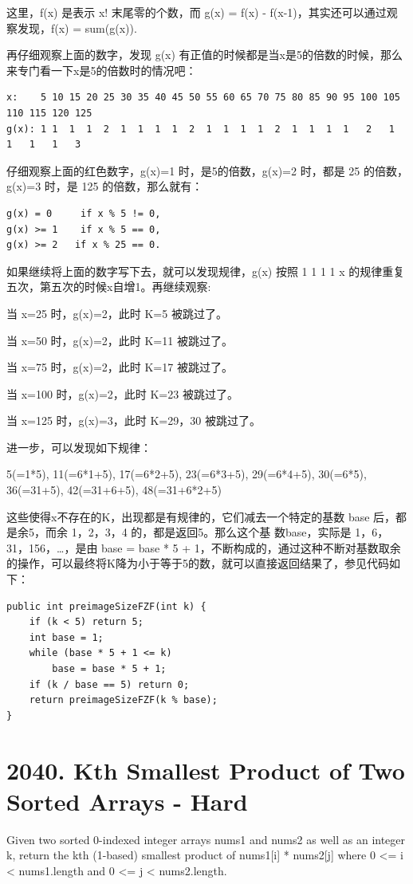 \documentclass[9pt, b5paaper]{book}
\begin{document}
这里，f(x) 是表示 x! 末尾零的个数，而 g(x) = f(x) - f(x-1)，其实还可以通过观察发现，f(x) = sum(g(x)).

再仔细观察上面的数字，发现 g(x) 有正值的时候都是当x是5的倍数的时候，那么来专门看一下x是5的倍数时的情况吧：

\begin{verbatim}
x:    5 10 15 20 25 30 35 40 45 50 55 60 65 70 75 80 85 90 95 100 105 110 115 120 125
g(x): 1 1  1  1  2  1  1  1  1  2  1  1  1  1  2  1  1  1  1   2   1   1   1   1   3
\end{verbatim}

仔细观察上面的红色数字，g(x)=1 时，是5的倍数，g(x)=2 时，都是 25 的倍数，g(x)=3 时，是 125 的倍数，那么就有：
\begin{verbatim}
g(x) = 0     if x % 5 != 0,
g(x) >= 1    if x % 5 == 0,
g(x) >= 2   if x % 25 == 0.
\end{verbatim}

如果继续将上面的数字写下去，就可以发现规律，g(x) 按照 1 1 1 1 x 的规律重复五次，第五次的时候x自增1。再继续观察:

当 x=25 时，g(x)=2，此时 K=5 被跳过了。

当 x=50 时，g(x)=2，此时 K=11 被跳过了。

当 x=75 时，g(x)=2，此时 K=17 被跳过了。

当 x=100 时，g(x)=2，此时 K=23 被跳过了。

当 x=125 时，g(x)=3，此时 K=29，30 被跳过了。

进一步，可以发现如下规律：

5(=1*5), 11(=6*1+5), 17(=6*2+5), 23(=6*3+5), 29(=6*4+5), 30(=6*5), 36(=31+5), 42(=31+6+5), 48(=31+6*2+5)

这些使得x不存在的K，出现都是有规律的，它们减去一个特定的基数 base 后，都是余5，而余 1，2，3，4 的，都是返回5。那么这个基 数base，实际是 1，6，31，156，\ldots{}，是由 base = base * 5 + 1，不断构成的，通过这种不断对基数取余的操作，可以最终将K降为小于等于5的数，就可以直接返回结果了，参见代码如下：
\begin{verbatim}
public int preimageSizeFZF(int k) {
    if (k < 5) return 5;
    int base = 1;
    while (base * 5 + 1 <= k) 
        base = base * 5 + 1;
    if (k / base == 5) return 0;
    return preimageSizeFZF(k % base);
}
\end{verbatim}

\section{2040. Kth Smallest Product of Two Sorted Arrays - Hard}
\label{sec-5-3}
Given two sorted 0-indexed integer arrays nums1 and nums2 as well as an integer k, return the kth (1-based) smallest product of nums1[i] * nums2[j] where 0 <= i < nums1.length and 0 <= j < nums2.length.
\end{document}
